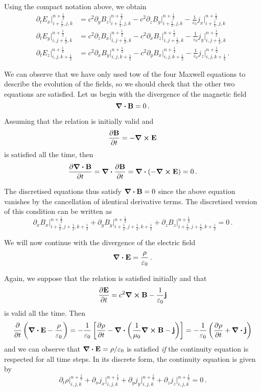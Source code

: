 \documentclass[12pt, class=report, crop=false]{standalone}
\begin{document}
Using the compact notation above, we obtain
\begin{align*}
  \partial_t E_x \rvert^{n+\frac{1}{2}}_{i+\frac{1}{2},j,k} &=
  c^2\partial_y B_z \rvert^{n+\frac{1}{2}}_{i+\frac{1}{2},j,k}
  -c^2\partial_z B_y \rvert^{n+\frac{1}{2}}_{i+\frac{1}{2},j,k}
  -\frac{1}{\varepsilon_0} j_x \rvert^{n+\frac{1}{2}}_{i+\frac{1}{2},j,k} \\
  \partial_t E_y \rvert^{n+\frac{1}{2}}_{i,j+\frac{1}{2},k} &=
  c^2\partial_z B_x \rvert^{n+\frac{1}{2}}_{i,j+\frac{1}{2},k}
  -c^2\partial_x B_z \rvert^{n+\frac{1}{2}}_{i,j+\frac{1}{2},k}
  -\frac{1}{\varepsilon_0} j_y \rvert^{n+\frac{1}{2}}_{i,j+\frac{1}{2},k} \\
  \partial_t E_z \rvert^{n+\frac{1}{2}}_{i,j,k+\frac{1}{2}} &=
  c^2\partial_x B_y \rvert^{n+\frac{1}{2}}_{i,j,k+\frac{1}{2}}
  -c^2\partial_y B_x \rvert^{n+\frac{1}{2}}_{i,j,k+\frac{1}{2}}
  -\frac{1}{\varepsilon_0} j_z \rvert^{n+\frac{1}{2}}_{i,j,k+\frac{1}{2}} \,.
\end{align*}

We can observe that we have only used tow of the four Maxwell equations to describe
the evolution of the fields, so we should check that the other two equations are
satisfied.
Let us begin with the divergence of the magnetic field
\[
\div{\vb{B}} = 0 \,.
\]

Assuming that the relation is initially valid and
\[
\pdv{\vb{B}}{t} = - \curl{\vb{E}}
\]
is satisfied all the time, then
\[
\pdv{\div{\vb{B}}}{t} = \div{\pdv{\vb{B}}{t}} = \div{\left(-\curl{\vb{E}}\right)} = 0\,.
\]

The discretised equations thus satisfy \(\div{\vb{B}} = 0\) since the above equation
vanishes by the cancellation of identical derivative terms.
The discretised version of this condition can be written as
\[
\partial_x B_x \rvert^{n+\frac{1}{2}}_{i+\frac{1}{2},j+\frac{1}{2},k+\frac{1}{2}} +
\partial_y B_y \rvert^{n+\frac{1}{2}}_{i+\frac{1}{2},j+\frac{1}{2},k+\frac{1}{2}} +
\partial_z B_z \rvert^{n+\frac{1}{2}}_{i+\frac{1}{2},j+\frac{1}{2},k+\frac{1}{2}}
= 0\,.
\]

We will now continue with the divergence of the electric field
\[
\div{\vb{E}} = \frac{\rho}{\varepsilon_0} \,.
\]

Again, we suppose that the relation is satisfied initially and that
\[
\pdv{\vb{E}}{t} = c^2 \curl{\vb{B}} - \frac{1}{\varepsilon_0} \vb{j}
\]
is valid all the time. Then
\[
\pdv{t} \left(\div{\vb{E}} - \frac{\rho}{\varepsilon_0}\right) =
-\frac{1}{\varepsilon_0} \left[\pdv{\rho}{t}
-\div{\left(\frac{1}{\mu_0} \curl{\vb{B}} - \vb{j}\right)}\right] =
-\frac{1}{\varepsilon_0} \left(\pdv{\rho}{t} + \div{\vb{j}}\right)
\]
and we can observe that
\(
\div{\vb{E}} = \rho/\varepsilon_0
\)
is satisfied \emph{if} the continuity equation is respected for all time steps.
In its discrete form, the continuity equation is given by
\[
\partial_t \rho \rvert^{n+\frac{1}{2}}_{i,j,k} +
\partial_x j_x \rvert^{n+\frac{1}{2}}_{i,j,k} +
\partial_y j_y \rvert^{n+\frac{1}{2}}_{i,j,k} +
\partial_z j_z \rvert^{n+\frac{1}{2}}_{i,j,k}
= 0\,.
\]
\end{document}
